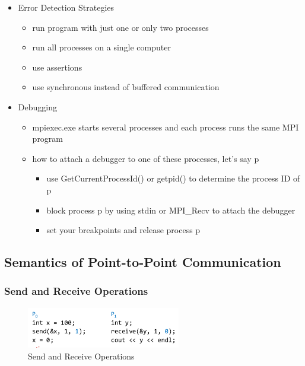 \begin{itemize}
\tightlist
\item
  Error Detection Strategies

  \begin{itemize}
  \tightlist
  \item
    run program with just one or only two processes
  \item
    run all processes on a single computer
  \item
    use assertions
  \item
    use synchronous instead of buffered communication
  \end{itemize}
\item
  Debugging

  \begin{itemize}
  \tightlist
  \item
    mpiexec.exe starts several processes and each process runs the same
    MPI program
  \item
    how to attach a debugger to one of these processes, let's say p

    \begin{itemize}
    \tightlist
    \item
      use GetCurrentProcessId() or getpid() to determine the process ID
      of p
    \item
      block process p by using stdin or MPI\_Recv to attach the debugger
    \item
      set your breakpoints and release process p
    \end{itemize}
  \end{itemize}
\end{itemize}

\hypertarget{semantics-of-point-to-point-communication}{%
\subsection{Semantics of Point-to-Point
Communication}\label{semantics-of-point-to-point-communication}}

\hypertarget{send-and-receive-operations}{%
\subsubsection{Send and Receive
Operations}\label{send-and-receive-operations}}

\begin{figure}[H]
\centering
\includegraphics[width=0.6\textwidth]{figures/sendReceiveMPI.png}
\caption{Send and Receive Operations}
\end{figure}

